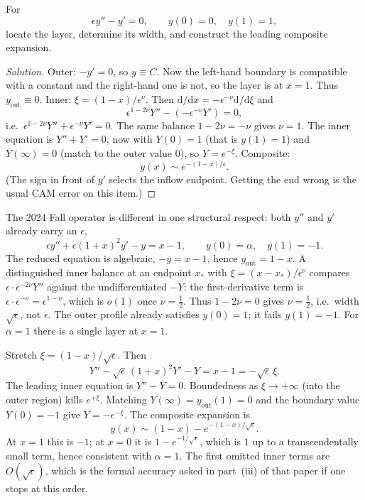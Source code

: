 \documentclass[11pt,a4paper]{article}
\begin{document}
\begin{exercise}
\label{exer:bl-other-end}
For
\[
\epsilon y''-y'=0,
\qquad
y(0)=0,\quad y(1)=1,
\]
locate the layer, determine its width, and construct the leading composite expansion.
\end{exercise}

\begin{proof}[Solution]
Outer: \(-y'=0\), so \(y\equiv C\). Now the left-hand boundary is compatible with a constant and the right-hand one is not, so the layer is at \(x=1\). Thus \(y_{\mathrm{out}}\equiv 0\). Inner: \(\xi=(1-x)/\epsilon^{\nu}\). Then \(\mathrm{d}/\mathrm{d}x=-\epsilon^{-\nu}\mathrm{d}/\mathrm{d}\xi\) and
\[
\epsilon^{1-2\nu}Y''-(-\epsilon^{-\nu}Y')=0,
\]
i.e.\ \(\epsilon^{1-2\nu}Y''+\epsilon^{-\nu}Y'=0\). The same balance \(1-2\nu=-\nu\) gives \(\nu=1\). The inner equation is \(Y''+Y'=0\), now with \(Y(0)=1\) (that is \(y(1)=1\)) and \(Y(\infty)=0\) (match to the outer value \(0\)), so \(Y=e^{-\xi}\). Composite:
\[
y(x)\sim e^{-(1-x)/\epsilon}.
\]
(The sign in front of \(y'\) selects the inflow endpoint. Getting the end wrong is the usual CAM error on this item.)
\end{proof}

\begin{example}[2024 Fall Problem~6, \(\alpha=1\)]
\label{ex:bl-2024fall}
The 2024 Fall operator is different in one structural respect: both \(y''\) and \(y'\) already carry an \(\epsilon\),
\[
\epsilon y''+\epsilon(1+x)^{2} y'-y=x-1,
\qquad
y(0)=\alpha,\quad y(1)=-1.
\]
The reduced equation is algebraic, \(-y=x-1\), hence \(y_{\mathrm{out}}=1-x\). A distinguished inner balance at an endpoint \(x_{*}\) with \(\xi=(x-x_{*})/\epsilon^{\nu}\) compares \(\epsilon\cdot\epsilon^{-2\nu}Y''\) against the undifferentiated \(-Y\): the first-derivative term is \(\epsilon\cdot\epsilon^{-\nu}=\epsilon^{1-\nu}\), which is \(o(1)\) once \(\nu=\frac12\). Thus \(1-2\nu=0\) gives \(\nu=\frac12\), i.e.\ width \(\sqrt{\epsilon}\), not \(\epsilon\). The outer profile already satisfies \(y(0)=1\); it fails \(y(1)=-1\). For \(\alpha=1\) there is a single layer at \(x=1\).

Stretch \(\xi=(1-x)/\sqrt{\epsilon}\). Then
\[
Y''-\sqrt{\epsilon}\,(1+x)^{2} Y'-Y
=
x-1
=
-\sqrt{\epsilon}\,\xi.
\]
The leading inner equation is \(Y''-Y=0\). Boundedness as \(\xi\to+\infty\) (into the outer region) kills \(e^{+\xi}\). Matching \(Y(\infty)=y_{\mathrm{out}}(1)=0\) and the boundary value \(Y(0)=-1\) give \(Y=-e^{-\xi}\). The composite expansion is
\[
y(x)
\sim
(1-x)-e^{-(1-x)/\sqrt{\epsilon}}.
\]
At \(x=1\) this is \(-1\); at \(x=0\) it is \(1-e^{-1/\sqrt{\epsilon}}\), which is \(1\) up to a transcendentally small term, hence consistent with \(\alpha=1\). The first omitted inner terms are \(O(\sqrt{\epsilon})\), which is the formal accuracy asked in part~(iii) of that paper if one stops at this order.
\end{example}
\end{document}

